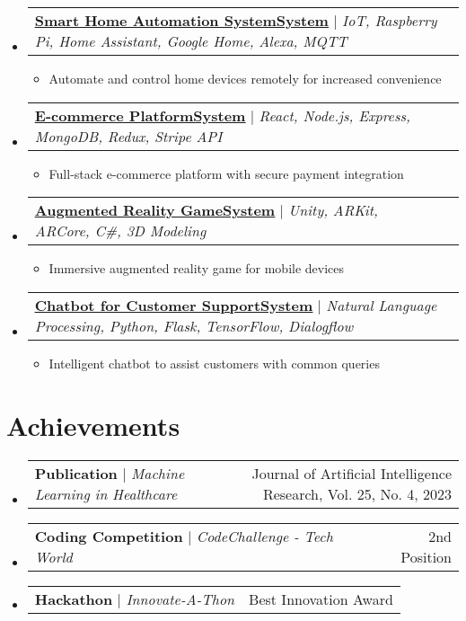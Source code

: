 \documentclass[letterpaper,11pt]{article}%
\makeatletter
\newcommand{\resumeItem}[1]{
  \item\small{
    {#1 \vspace{-2pt}}
  }
}
\newcommand{\resumeProjectHeading}[2]{
    \item
    \begin{tabular*}{0.97\textwidth}{l@{\extracolsep{\fill}}r}
      \small#1 & #2 \\
    \end{tabular*}\vspace{-7pt}
}
\newcommand{\resumeSubHeadingListStart}{\begin{itemize}[leftmargin=0.15in, label={}]}
\newcommand{\resumeSubHeadingListEnd}{\end{itemize}}
\newcommand{\resumeItemListStart}{\begin{itemize}}
\newcommand{\resumeItemListEnd}{\end{itemize}\vspace{-5pt}}
\makeatother
\begin{document}
%
\resumeSubHeadingListStart%
\resumeProjectHeading%
{\textbf{\href{https://github.com/JohnDoe/Smart-Home-Automation}{\underline{Smart Home Automation SystemSystem}}} $|$ \footnotesize\emph{IoT, Raspberry Pi, Home Assistant, Google Home, Alexa, MQTT}}{}%
\resumeItemListStart%
\resumeItem{Automate and control home devices remotely for increased convenience}%
\resumeItemListEnd%
\resumeProjectHeading%
{\textbf{\href{https://github.com/JohnDoe/E-commerce-Platform}{\underline{E-commerce PlatformSystem}}} $|$ \footnotesize\emph{React, Node.js, Express, MongoDB, Redux, Stripe API}}{}%
\resumeItemListStart%
\resumeItem{Full{-}stack e{-}commerce platform with secure payment integration}%
\resumeItemListEnd%
\resumeProjectHeading%
{\textbf{\href{https://github.com/JohnDoe/AR-Game}{\underline{Augmented Reality GameSystem}}} $|$ \footnotesize\emph{Unity, ARKit, ARCore, C\#, 3D Modeling}}{}%
\resumeItemListStart%
\resumeItem{Immersive augmented reality game for mobile devices}%
\resumeItemListEnd%
\resumeProjectHeading%
{\textbf{\href{https://github.com/JohnDoe/Customer-Support-Chatbot}{\underline{Chatbot for Customer SupportSystem}}} $|$ \footnotesize\emph{Natural Language Processing, Python, Flask, TensorFlow, Dialogflow}}{}%
\resumeItemListStart%
\resumeItem{Intelligent chatbot to assist customers with common queries}%
\resumeItemListEnd%
\resumeSubHeadingListEnd%
\section{Achievements}%
\label{sec:Achievements}%

%
\resumeSubHeadingListStart%
\resumeProjectHeading%
{\textbf{Publication} $|$ \footnotesize\emph{Machine Learning in Healthcare}}{Journal of Artificial Intelligence Research, Vol. 25, No. 4, 2023}%
\resumeProjectHeading%
{\textbf{Coding Competition} $|$ \footnotesize\emph{CodeChallenge - Tech World}}{2nd Position}%
\resumeProjectHeading%
{\textbf{Hackathon} $|$ \footnotesize\emph{Innovate-A-Thon}}{Best Innovation Award}%
\resumeSubHeadingListEnd%
\end{document}
